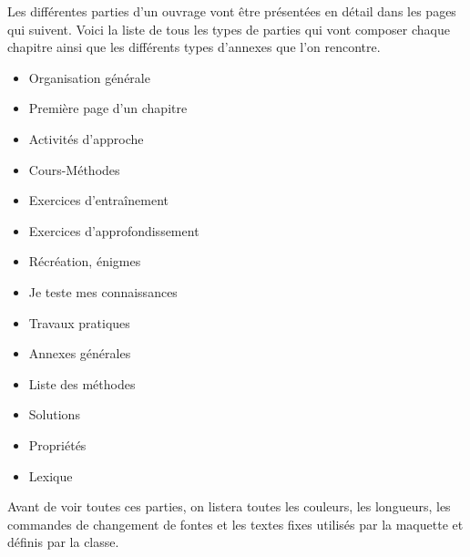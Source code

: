 \documentclass[nocrop]{sesamanuel}
\begin{document}
\begin{prerequis}
  Les différentes parties d'un ouvrage vont être présentées en détail
  dans les pages qui suivent. Voici la liste de tous les types de
  parties qui vont composer chaque chapitre ainsi que les différents
  types d'annexes que l'on rencontre.
  \begin{itemize}
  \item Organisation générale
  \item Première page d'un chapitre
  \item Activités d'approche
  \item Cours-Méthodes
  \item Exercices d'entraînement
  \item Exercices d'approfondissement
  \item Récréation, énigmes
  \item Je teste mes connaissances
  \item Travaux pratiques
  \item Annexes générales
  \item Liste des méthodes
  \item Solutions
  \item Propriétés
  \item Lexique
  \end{itemize}
  Avant de voir toutes ces parties, on listera toutes les couleurs,
  les longueurs, les commandes de changement de fontes et les textes
  fixes utilisés par la maquette et définis par la classe.
\end{prerequis}
\end{document}
